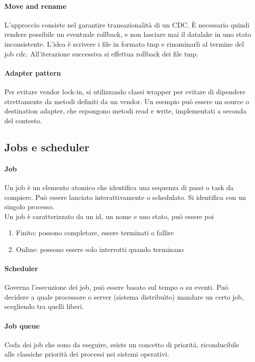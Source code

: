 \paragraph{Move and rename}
L'approccio consiste nel garantire transazionalità di un CDC. 
È necessario quindi rendere possibile un eventuale rollback, e non lasciare mai 
il datalake in uno stato inconsistente.
L'idea è scrivere i file in formato tmp e rinominarli al termine del job cdc.
All'iterazione successiva si effettua rollback dei file tmp.

\paragraph{Adapter pattern}
Per evitare vendor lock-in, si utilizzando classi wrapper per evitare di dipendere
strettamente da metodi definiti da un vendor.
Un esempio può essere un source o destination adapter, che espongono metodi read e 
write, implementati a seconda del contesto.

\subsection{Jobs e scheduler}
\paragraph{Job}
Un job è un elemento atomico che identifica una sequenza di passi o task da compiere. Può essere lanciato interattivamente o schedulato. Si identifica con 
un singolo processo.\\
Un job è caratterizzato da un id, un nome e uno stato, può essere poi 
\begin{enumerate}
    \item Finito: possono completare, essere terminati o fallire
    \item Online: possono essere solo interrotti quando terminano
\end{enumerate}

\paragraph{Scheduler}
Governa l'esecuzione dei job, può essere basato sul tempo o su eventi.
Può decidere a quale processore o server (sistema distribuito) mandare un certo job, scegliendo tra quelli liberi.

\paragraph{Job queue}
Coda dei job che sono da eseguire, esiste un concetto di priorità, riconducibile alle classiche priorità dei processi nei sistemi operativi.

